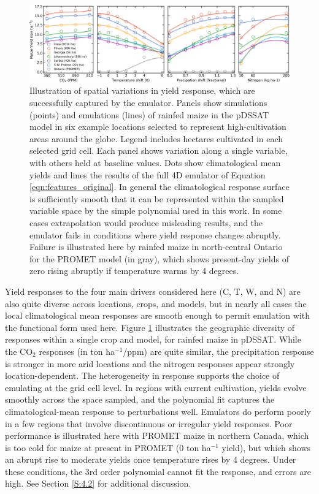 \documentclass[gmd, manuscript]{copernicus} %
\begin{document}
\begin{figure}[ht]
\centering
    \includegraphics[width=16.3cm]{figures/regression_example.png}
    \caption{
    Illustration of spatial variations in yield response, which are successfully captured by the emulator. 
    Panels show simulations (points) and emulations (lines) of rainfed maize in the pDSSAT model in six example locations selected to represent high-cultivation areas around the globe. 
    Legend includes hectares cultivated in each selected grid cell. 
    Each panel shows variation along a single variable, with others held at baseline values. 
    Dots show climatological mean yields and lines the results of the full 4D emulator of Equation \ref{eqn:features_original}. 
    In general the climatological response surface is sufficiently smooth that it can be represented within the sampled variable space by the simple polynomial used in this work. 
    In some cases extrapolation would produce misleading results, and the emulator fails in conditions where yield response changes abruptly. 
    Failure is illustrated here by rainfed maize in north-central Ontario for the PROMET model (in gray), which shows present-day yields of zero rising abruptly if temperature warms by 4 degrees.
    }
   \label{fig:regression}
\end{figure}

Yield responses to the four main drivers considered here (C, T, W, and N) are also quite diverse across locations, crops, and models, but in nearly all cases the local climatological mean responses are smooth enough to permit emulation with the functional form used here.
Figure \ref{fig:regression} illustrates the geographic diversity of responses within a single crop and model, for rainfed maize in pDSSAT. 
While the CO$_2$ responses (in ton ha$^{-1}$/ppm) are quite similar, the  precipitation response is stronger in more arid locations and the nitrogen responses appear strongly location-dependent. 
The heterogeneity in response supports the choice of emulating at the grid cell level. 
In regions with current cultivation, yields evolve smoothly across the space sampled, and the polynomial fit captures the climatological-mean response to perturbations well. 
Emulators do perform poorly in a few regions that involve discontinuous or irregular yield responses. 
Poor performance is illustrated here with PROMET maize in northern Canada, which is too cold for maize at present in PROMET (0 ton ha$^{-1}$ yield), but which shows an abrupt rise to moderate yields once temperature rises by 4 degrees.
Under these conditions, the 3rd order polynomial cannot fit the response, and errors are high. See Section \ref{S:4.2} for additional discussion. 
\end{document}
